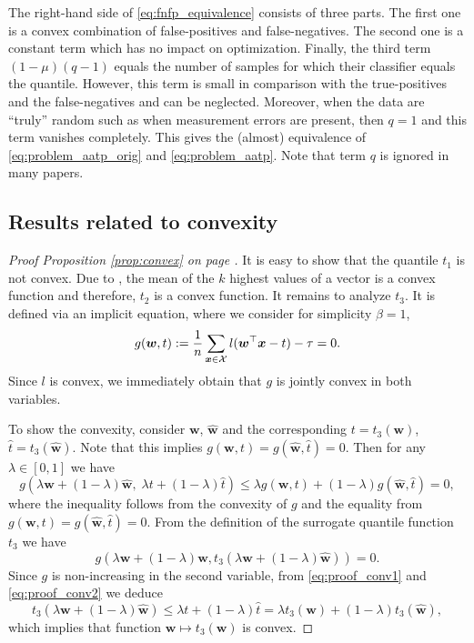 The right-hand side of \eqref{eq:fnfp_equivalence} consists of three parts. The first one is a convex combination of false-positives and false-negatives. The second one is a constant term which has no impact on optimization. Finally, the third term $(1-\mu)\left(q - 1\right)$ equals the number of samples for which their classifier equals the quantile. However, this term is small in comparison with the true-positives and the false-negatives and can be neglected. Moreover, when the data are ``truly'' random such as when measurement errors are present, then $q=1$ and this term vanishes completely. This gives the (almost) equivalence of \eqref{eq:problem_aatp_orig} and \eqref{eq:problem_aatp}. Note that term $q$ is ignored in many papers.

\subsection{Results related to convexity}

\propconvex*
\begin{proof}[Proof Proposition \ref{prop:convex} on page \pageref{prop:convex}]
  It is easy to show that the quantile $t_1$ is not convex. Due to \cite{lapin2015top}, the mean of the $k$ highest values of a vector is a convex function and therefore, $t_2$ is a convex function. It remains to analyze $t_3$. It is defined via an implicit equation, where we consider for simplicity $\beta=1$,
  \begin{equation*}
    g(\bm{w},t) := \frac{1}{n}\sum_{\bm{x} \in \mathcal{X}} l(\bm{w}^\top \bm{x}-t) - \tau = 0.
  \end{equation*}
  Since $l$ is convex, we immediately obtain that $g$ is jointly convex in both variables.

  To show the convexity, consider $\bm{w}$, $\hat{\bm{w}}$ and the corresponding $t= t_3(\bm{w})$, $\hat{t}=t_3(\hat{\bm{w}})$. Note that this implies $g(\bm{w}, t)=g(\hat{\bm{w}},\hat{t})=0$. Then for any $\lambda\in[0,1]$ we have 
  \begin{equation}\label{eq:proof_conv1}
    g(\lambda \bm{w} + (1 - \lambda)\hat{\bm{w}},\;\lambda t + (1 - \lambda)\hat{t})
    \le \lambda g(\bm{w}, t) + (1 - \lambda) g(\hat{\bm{w}}, \hat{t}) = 0,
  \end{equation}
  where the inequality follows from the convexity of $g$ and the equality from $g(\bm{w}, t) = g(\hat{\bm{w}}, \hat{t})=0.$
  From the definition of the surrogate quantile function $t_3$ we have
  \begin{equation}\label{eq:proof_conv2}
    g(\lambda\bm{w} + (1-\lambda)\hat{\bm{w}}, t_3(\lambda\bm{w} + (1-\lambda)\hat{\bm{w}})) = 0.
  \end{equation}
  Since $g$ is non-increasing in the second variable, from \eqref{eq:proof_conv1} and \eqref{eq:proof_conv2} we deduce
  \begin{equation*}
    t_3(\lambda\bm{w} + (1-\lambda)\hat{\bm{w}})
    \le \lambda t + (1-\lambda)\hat{t}
    =   \lambda t_3(\bm{w})+(1-\lambda) t_3(\hat{\bm{w}}),
  \end{equation*}
  which implies that function $\bm{w}\mapsto t_3(\bm{w})$ is convex.
\end{proof}

